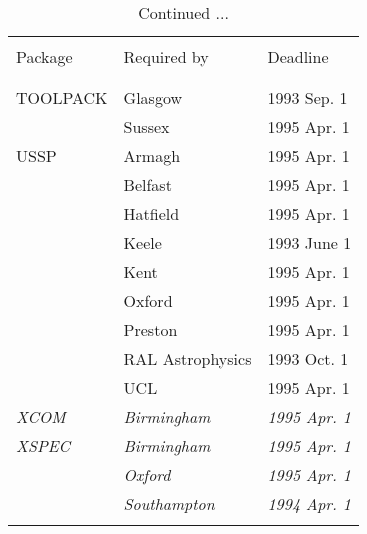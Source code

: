 \addtocounter{table}{-1}
\begin{table}
\caption{Continued ...}
\vspace{5mm}
\begin{center}
\begin{tabular}{|p{36mm}|p{50mm}|p{30mm}|} \hline
& & \\
Package & Required by & Deadline \\
& & \\ \hline
& & \\
TOOLPACK              & Glasgow          & 1993 Sep. 1 \\
                      & Sussex           & 1995 Apr. 1 \\
USSP                  & Armagh           & 1995 Apr. 1 \\
                      & Belfast          & 1995 Apr. 1 \\
                      & Hatfield         & 1995 Apr. 1 \\
                      & Keele            & 1993 June 1 \\
                      & Kent             & 1995 Apr. 1 \\
                      & Oxford           & 1995 Apr. 1 \\
                      & Preston          & 1995 Apr. 1 \\
                      & RAL Astrophysics & 1993 Oct. 1 \\
                      & UCL              & 1995 Apr. 1 \\
{\em XCOM}            & {\em Birmingham} & {\em 1995 Apr. 1} \\
{\em XSPEC}           & {\em Birmingham} & {\em 1995 Apr. 1} \\
                      & {\em Oxford}     & {\em 1995 Apr. 1} \\
                      & {\em Southampton} & {\em 1994 Apr. 1} \\
& & \\ \hline
\end{tabular}
\end{center}
\end{table}


